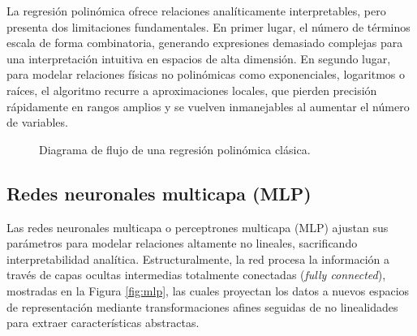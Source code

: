 \documentclass[11pt, a4paper]{article}
\begin{document}
La regresión polinómica ofrece relaciones analíticamente interpretables, pero presenta dos limitaciones fundamentales. En primer lugar, el número de términos escala de forma combinatoria, generando expresiones demasiado complejas para una interpretación intuitiva en espacios de alta dimensión. En segundo lugar, para modelar relaciones físicas no polinómicas como exponenciales, logaritmos o raíces, el algoritmo recurre a aproximaciones locales, que pierden precisión rápidamente en rangos amplios y se vuelven inmanejables al aumentar el número de variables.\vspace{-4mm}
\FloatBarrier
\begin{figure}[H]
    \centering
    \caption{Diagrama de flujo de una regresión polinómica clásica.}
\end{figure}




\subsection{Redes neuronales multicapa (MLP)}
Las redes neuronales multicapa o perceptrones multicapa (MLP) ajustan sus parámetros para modelar relaciones altamente no lineales, sacrificando interpretabilidad analítica. Estructuralmente, la red procesa la información a través de capas ocultas intermedias totalmente conectadas (\textit{fully connected}), mostradas en la Figura \ref{fig:mlp}, las cuales proyectan los datos a nuevos espacios de representación mediante transformaciones afines seguidas de no linealidades para extraer características abstractas.
\end{document}
